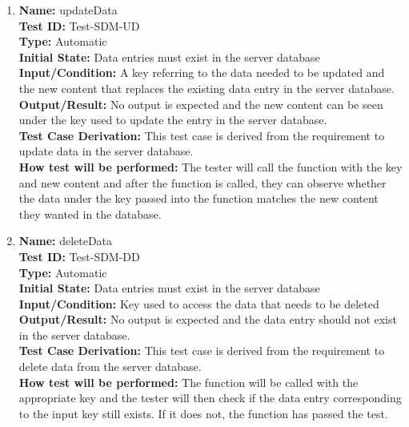 \documentclass[12pt, titlepage]{article}
\begin{document}
\begin{enumerate}
  \item \textbf{Name:} updateData \label{itm:Test-SDM-UD} \\
        \textbf{Test ID:} Test-SDM-UD \\
        \textbf{Type:} Automatic \\
        \textbf{Initial State:} Data entries must exist in the server database \\
        \textbf{Input/Condition:} A key referring to the data needed to be updated and the new content that replaces the existing data entry in the server database. \\
        \textbf{Output/Result:} No output is expected and the new content can be seen under the key used to update the entry in the server database. \\
        \textbf{Test Case Derivation:} This test case is derived from the requirement to update data in the server database. \\
        \textbf{How test will be performed:} The tester will call the function with the key and new content and after the function is called, they can observe whether the data under the key passed into the function matches the new content they wanted in the database. \\

  \item \textbf{Name:} deleteData \label{itm:Test-SDM-DD} \\
        \textbf{Test ID:} Test-SDM-DD \\
        \textbf{Type:} Automatic \\
        \textbf{Initial State:} Data entries must exist in the server database \\
        \textbf{Input/Condition:} Key used to access the data that needs to be deleted \\
        \textbf{Output/Result:} No output is expected and the data entry should not exist in the server database. \\
        \textbf{Test Case Derivation:} This test case is derived from the requirement to delete data from the server database. \\
        \textbf{How test will be performed:} The function will be called with the appropriate key and the tester will then check if the data entry corresponding to the input key still exists. If it does not, the function has passed the test. \\


\end{enumerate}
\end{document}
